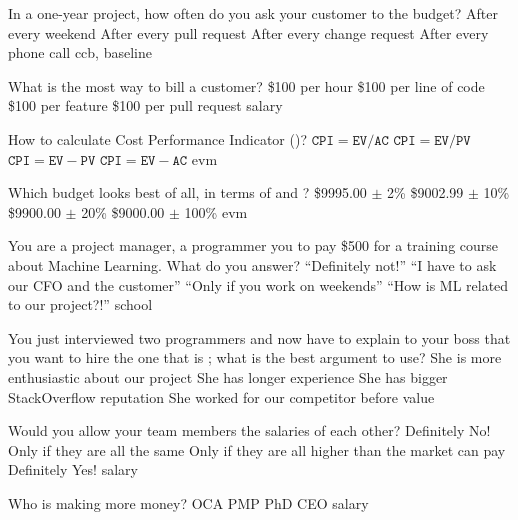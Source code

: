 \documentclass{article}
\begin{document}

\pmbaQuestion
  {In a one-year project, how often do you ask your customer to  the budget?}
  {After every weekend}
  {After every pull request}
  {After every change request}
  {After every phone call}
  {ccb, baseline}

\pmbaQuestion
  {What is the most  way to bill a customer?}
  {\$100 per hour}
  {\$100 per line of code}
  {\$100 per feature}
  {\$100 per pull request}
  {salary}

\pmbaQuestion
  {How to calculate Cost Performance Indicator ()?}
  {\(\texttt{CPI} = \texttt{EV} / \texttt{AC}\)} %
  {\(\texttt{CPI} = \texttt{EV} / \texttt{PV}\)} %
  {\(\texttt{CPI} = \texttt{EV} - \texttt{PV}\)} %
  {\(\texttt{CPI} = \texttt{EV} - \texttt{AC}\)} %
  {evm}

\pmbaQuestion
  {Which budget looks best of all, in terms of  and ?}
  {\$9995.00 \(\pm{}\) 2\%}
  {\$9002.99 \(\pm{}\) 10\%}
  {\$9900.00 \(\pm{}\) 20\%}
  {\$9000.00 \(\pm{}\) 100\%}
  {evm}

\pmbaQuestion
  {You are a project manager, a programmer  you to pay \$500
    for a training course about Machine Learning. What do you answer?}
  {``Definitely not!''}
  {``I have to ask our CFO and the customer''}
  {``Only if you work on weekends''}
  {``How is ML related to our project?!''}
  {school}

\pmbaQuestion
  {You just interviewed two programmers and now have to explain
    to your boss that you want to hire the one that is ;
    what is the best argument to use?}
  {She is more enthusiastic about our project}
  {She has longer experience}
  {She has bigger StackOverflow reputation}
  {She worked for our competitor before}
  {value}

\pmbaQuestion
  {Would you allow your team members  the salaries of each other?}
  {Definitely No!}
  {Only if they are all the same}
  {Only if they are all higher than the market can pay}
  {Definitely Yes!}
  {salary}

\pmbaQuestion
  {Who is making more money?}
  {OCA}
  {PMP}
  {PhD}
  {CEO}
  {salary}

\end{document}

